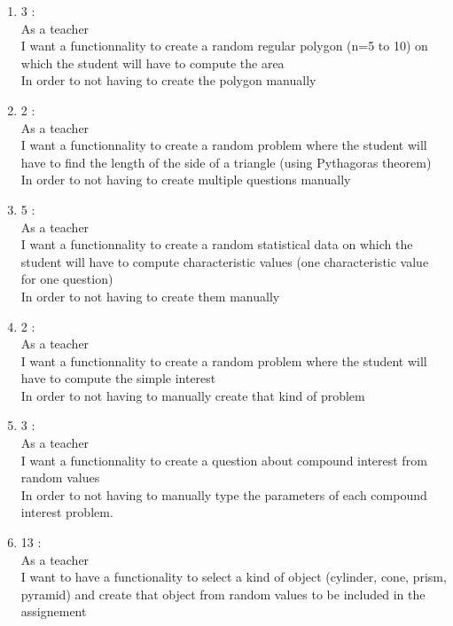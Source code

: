 \documentclass{article}
\begin{document}
\begin{enumerate}
    \item 3 :\\ %
    As a teacher\\
    I want a functionnality to create a random regular polygon (n=5 to 10) on which the student will have to compute the area\\
    In order to not having to create the polygon manually\\

    \item 2 :\\ %
    As a teacher\\
    I want a functionnality to create a random problem where the student will have to find the length of the side of a triangle (using Pythagoras theorem)\\
    In order to not having to create multiple questions manually \\

    \item 5 :\\ %
    As a teacher\\
    I want a functionnality to create a random statistical data on which the student will have to compute characteristic values (one characteristic value for one question)\\
    In order to not having to create them manually\\

    \item 2 :\\ %
    As a teacher\\
    I want a functionnality to create a random problem where the student will have to compute the simple interest\\
    In order to not having to manually create that kind of problem\\

    \item 3 :\\ %
    As a teacher\\
    I want a functionnality to create a question about compound interest from random values\\
    In order to not having to manually type the parameters of each compound interest problem.\\

    \item 13 : \\ %
    As a teacher\\
    I want to have a functionality to select a kind of object (cylinder, cone, prism, pyramid) and create that object from random values to be included in the assignement


\end{enumerate}
\end{document}
